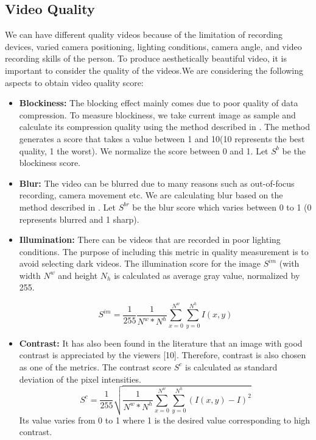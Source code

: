 \documentclass{sig-alternate}
\begin{document}
\subsection{Video Quality}
We can have different quality videos because of the limitation of recording devices, varied camera positioning, lighting conditions, camera angle, and video recording skills of the person. To produce aesthetically beautiful video, it is important to consider the quality of the videos.We are considering the following aspects to obtain video quality score:
\begin{itemize}
\item \textbf{Blockiness:} The blocking effect mainly comes due to poor quality of data compression. To measure blockiness, we take current image as sample and calculate its compression quality using the method described in \cite{carter2007ceramic}. The method generates  a score that takes a value between 1 and 10(10 represents the best quality, 1 the worst). We normalize the score between 0 and 1. Let \(S^b\) be the blockiness score. 
\item \textbf{Blur:} The video can be blurred due to many reasons such as out-of-focus recording, camera movement etc. We are calculating blur based on the method described in \cite{cabrera2001path}. Let \(S^{br}\) be the blur score which varies between 0 to 1 (0 represents blurred and 1 sharp). 
\item \textbf{Illumination:} There can be videos that are recorded in poor lighting conditions. The purpose of including this metric in quality measurement is to avoid selecting dark videos. The illumination score for the image \(S^{im}\) (with width \(N^w\) and height \(N_h\) is calculated as average gray value, normalized by 255.

\begin{equation}
 S^{im} = \frac{1}{255}\frac{1}{N^w * N^h}\sum_{x=0}^{N^w}\sum_{y=0}^{N^h}I(x,y) 
\end{equation}
\item \textbf{Contrast:} It has also been found in the literature that an image with good contrast is appreciated by the viewers [10]. Therefore, contrast is also chosen as one of the metrics. The contrast score \(S^c\) is calculated as standard deviation of the pixel intensities.
\begin{equation}
S^c = \frac{1}{255} \sqrt{\frac{1}{N^w * N^h}\sum_{x=0}^{N^w}\sum_{y=0}^{N^h}(I(x,y) - I)^2}
\end{equation}
Its value varies from 0 to 1 where 1 is the desired value corresponding to high contrast.


\end{itemize}
\end{document}
